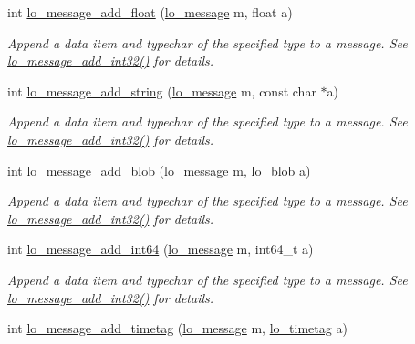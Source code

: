 \begin{DoxyCompactItemize}
int \hyperlink{group__liblolowlevel_ga42815097ea691fd1ec0798beca7f8e5e}{lo\-\_\-message\-\_\-add\-\_\-float} (\hyperlink{lo__types_8h_ad126083c98d941f00eb72d1690b38d63}{lo\-\_\-message} m, float a)
\begin{DoxyCompactList}\small\item\em \-Append a data item and typechar of the specified type to a message. \-See \hyperlink{group__liblolowlevel_ga7c9df1bd975a32fb6c8105e6fe327149}{lo\-\_\-message\-\_\-add\-\_\-int32()} for details. \end{DoxyCompactList}\item 
int \hyperlink{group__liblolowlevel_ga4ff414b1b3d87454668dfd728b830888}{lo\-\_\-message\-\_\-add\-\_\-string} (\hyperlink{lo__types_8h_ad126083c98d941f00eb72d1690b38d63}{lo\-\_\-message} m, const char $\ast$a)
\begin{DoxyCompactList}\small\item\em \-Append a data item and typechar of the specified type to a message. \-See \hyperlink{group__liblolowlevel_ga7c9df1bd975a32fb6c8105e6fe327149}{lo\-\_\-message\-\_\-add\-\_\-int32()} for details. \end{DoxyCompactList}\item 
int \hyperlink{group__liblolowlevel_gac0ae2fc81d2a48fe63b0803637997fd4}{lo\-\_\-message\-\_\-add\-\_\-blob} (\hyperlink{lo__types_8h_ad126083c98d941f00eb72d1690b38d63}{lo\-\_\-message} m, \hyperlink{lo__types_8h_a8e780f8c09e3e4dd737fe249f11d16fc}{lo\-\_\-blob} a)
\begin{DoxyCompactList}\small\item\em \-Append a data item and typechar of the specified type to a message. \-See \hyperlink{group__liblolowlevel_ga7c9df1bd975a32fb6c8105e6fe327149}{lo\-\_\-message\-\_\-add\-\_\-int32()} for details. \end{DoxyCompactList}\item 
int \hyperlink{group__liblolowlevel_ga282ef81387abab0ce18f7479a4a817b5}{lo\-\_\-message\-\_\-add\-\_\-int64} (\hyperlink{lo__types_8h_ad126083c98d941f00eb72d1690b38d63}{lo\-\_\-message} m, int64\-\_\-t a)
\begin{DoxyCompactList}\small\item\em \-Append a data item and typechar of the specified type to a message. \-See \hyperlink{group__liblolowlevel_ga7c9df1bd975a32fb6c8105e6fe327149}{lo\-\_\-message\-\_\-add\-\_\-int32()} for details. \end{DoxyCompactList}\item 
int \hyperlink{group__liblolowlevel_ga03f8eafa4ba598c545f30e17b23d1c89}{lo\-\_\-message\-\_\-add\-\_\-timetag} (\hyperlink{lo__types_8h_ad126083c98d941f00eb72d1690b38d63}{lo\-\_\-message} m, \hyperlink{structlo__timetag}{lo\-\_\-timetag} a)

\end{DoxyCompactItemize}
